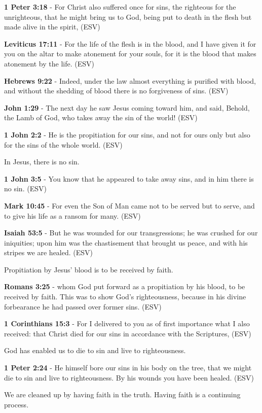\documentclass[11pt]{article}
\begin{document}
\textbf{1 Peter 3:18} - For Christ also suffered once for sins, the righteous for the unrighteous, that he might bring us to God, being put to death in the flesh but made alive in the spirit,  (ESV)

\textbf{Leviticus 17:11} - For the life of the flesh is in the blood, and I have given it for you on the altar to make atonement for your souls, for it is the blood that makes atonement by the life.  (ESV)

\textbf{Hebrews 9:22} - Indeed, under the law almost everything is purified with blood, and without the shedding of blood there is no forgiveness of sins.  (ESV)

\textbf{John 1:29} - The next day he saw Jesus coming toward him, and said, Behold, the Lamb of God, who takes away the sin of the world!  (ESV)

\textbf{1 John 2:2} - He is the propitiation for our sins, and not for ours only but also for the sins of the whole world.  (ESV)

In Jesus, there is no sin.

\textbf{1 John 3:5} - You know that he appeared to take away sins, and in him there is no sin.  (ESV)

\textbf{Mark 10:45} -  For even the Son of Man came not to be served but to serve, and to give his life as a ransom for many.  (ESV)

\textbf{Isaiah 53:5} -  But he was wounded for our transgressions; he was crushed for our iniquities; upon him was the chastisement that brought us peace, and with his stripes we are healed.  (ESV)

Propitiation by Jesus' blood is to be received by faith.

\textbf{Romans 3:25} -  whom God put forward as a propitiation by his blood, to be received by faith.  This was to show God's righteousness, because in his divine forbearance he had passed over former sins.  (ESV)

\textbf{1 Corinthians 15:3} -  For I delivered to you as of first importance what I also received: that Christ died for our sins in accordance with the Scriptures,  (ESV)

God has enabled us to die to sin and live to righteousness.

\textbf{1 Peter 2:24} -  He himself bore our sins in his body on the tree, that we might die to sin and live to righteousness.  By his wounds you have been healed.  (ESV)

We are cleaned up by having faith in the truth. Having faith is a continuing process.
\end{document}
